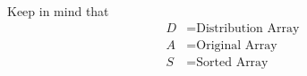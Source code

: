 \documentclass[preview]{standalone}
\begin{document}
\begin{center}
Keep in mind that\begin{align*}D & = \text{Distribution Array} \\A & = \text{Original Array} \\S & = \text{Sorted Array} \\\end{align*}
\end{center}
\end{document}
